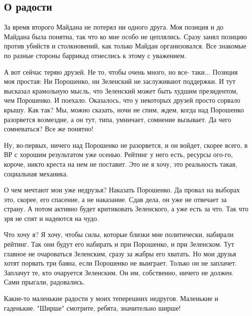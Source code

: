 
 
 
 
 
\subsection{О радости}
\label{sec:15_04_2019.fb.zharkih_denis.1.o_radosti}

За время второго Майдана не потерял ни одного друга. Моя позиция и до Майдана
была понятна, так что ко мне особо не цеплялись. Сразу занял позицию против
убийств и столкновений, как только Майдан организовался. Все знакомые по разные
стороны баррикад отнеслись к этому с уважением. 

А вот сейчас теряю друзей. Не то, чтобы очень много, но все- таки... Позиция
моя простая: Ни Порошенко, ни Зеленский не заслуживают поддержки. И тут
высказал крамольную мысль, что Зеленский может быть худшим президентом, чем
Порошенко. И поехало. Оказалось, что у некоторых друзей просто сорвало крышу.
Как так? Мы, можно сказать, ночи не спим, ждем, когда над Порошенко разорвется
возмездие, а он тут, типа, умничает, сомнение вызывает. Да чего сомневаться?
Все же понятно!

Ну, во-первых, ничего над Порошенко не разорвется, и он войдет, скорее всего, в
ВР с хорошим результатом уже осенью.  Рейтинг у него есть, ресурсы ого-го,
короче, никто креста на нем не поставит. Это не я хочу, это реальность такая,
социальная механика. 

О чем мечтают мои уже недрузья? Наказать Порошенко. Да провал на выборах это,
скорее, его спасение, а не наказание. Сдав дела, он уже не отвечает за страну.
А потом активно будет критиковать Зеленского, а уже есть за что. Так что зря не
спят и надеются на чудо. 

Что хочу я? Я хочу, чтобы силы, которые близки мне политически, набирали
рейтинг. Так они будут его набирать и при Порошенко, и при Зеленском. Тут
главное не очароваться Зеленским, сразу за жабры его хватать. Но мои друзья
хотят порвать три баяна, если Порошенко не выиграет. Только он не заплачет.
Заплачут те, кто очаруется Зеленским. Он им, собственно, ничего не должен. Сами
прыгали, радовались.  

Какие-то маленькие радости у моих теперешних недругов.
Маленькие и гаденькие. "Ширше" смотрите, ребята, значительно ширше!

